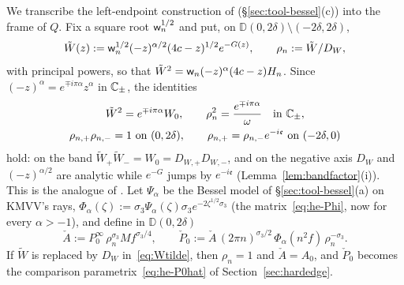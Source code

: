 We transcribe the left-endpoint construction of \cite[(6.42)--(6.53)]{KMVV} (\S\ref{sec:tool-bessel}(c)) into the
frame of $Q$. Fix a square root $\mathsf w_n^{1/2}$ and put, on $\mathbb D(0,2\delta)\setminus(-2\delta,2\delta)$,
\begin{equation}\label{eq:Wtilde}
  \tilde W(z):=\mathsf w_n^{1/2}(-z)^{\alpha/2}(4c-z)^{1/2}e^{-G(z)},\qquad \rho_n:=\tilde W/D_W ,
\end{equation}
with principal powers, so that $\tilde W^2=\mathsf w_n(-z)^\alpha(4c-z)H_n$. Since $(-z)^\alpha=e^{\mp i\pi\alpha}z^\alpha$ in
$\mathbb{C}_\pm$, the identities
\begin{equation}\label{eq:rho-props}
\begin{gathered}
  \tilde W^2=e^{\mp i\pi\alpha}W_0,\qquad \rho_n^2=\frac{e^{\mp i\pi\alpha}}{\omega}\quad\text{in }\mathbb{C}_\pm,\\
  \rho_{n,+}\rho_{n,-}=1\ \text{on }(0,2\delta),\qquad \rho_{n,+}=\rho_{n,-}e^{-i\mathfrak e}\ \text{on }(-2\delta,0)
\end{gathered}
\end{equation}
hold: on the band $\tilde W_+\tilde W_-=W_0=D_{W,+}D_{W,-}$, and on the negative axis $D_W$ and $(-z)^{\alpha/2}$ are
analytic while $e^{-G}$ jumps by $e^{-i\mathfrak e}$ (Lemma~\ref{lem:bandfactor}(i)). This is the analogue of
\cite[(6.44)--(6.46)]{KMVV}. Let $\Psi_\alpha$ be the Bessel model of \S\ref{sec:tool-bessel}(a) on KMVV's rays,
$\Phi_\alpha(\zeta):=\sigma_3\Psi_\alpha(\zeta)\sigma_3e^{-2\zeta^{1/2}\sigma_3}$ (the matrix~\eqref{eq:he-Phi}, now for
every $\alpha>-1$), and define in $\mathbb D(0,2\delta)$
\begin{equation}\label{eq:Pcheck}
  \check A:=P^\infty_0\,\rho_n^{\sigma_3}Mf^{\sigma_3/4},\qquad
  \check P_0:=\check A\,(2\pi n)^{\sigma_3/2}\,\Phi_\alpha(n^2f)\,\rho_n^{-\sigma_3}.
\end{equation}
If $\tilde W$ is replaced by $D_W$ in~\eqref{eq:Wtilde}, then $\rho_n=1$ and $\check A=A_0$, and $\check P_0$
becomes the comparison parametrix~\eqref{eq:he-P0hat} of Section~\ref{sec:hardedge}.

